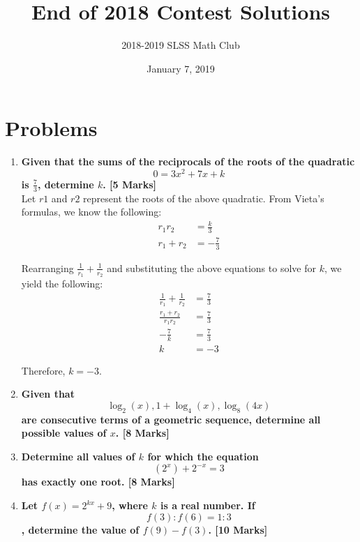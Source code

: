 \documentclass[12pt]{article}
\title{End of 2018 Contest Solutions\vspace{-3mm}}
\author{2018-2019 SLSS Math Club\vspace{-5mm}}
\date{January 7, 2019\vspace{-5mm}}
\begin{document}
\maketitle

\section*{Problems}

\begin{enumerate}
    \item \textbf{Given that the sums of the reciprocals of the roots of the quadratic $$ 0 = 3x^2 + 7x + k$$ is $\displaystyle{\frac{7}{3}}$, determine $k$. [5 Marks]} \\
    
    Let $r1$ and $r2$ represent the roots of the above quadratic.  From Vieta's formulas, we know the following:
    \begin{align*}
        r_1r_2 &= \frac{k}{3} \\
        r_1 + r_2 &= -\frac{7}{3}
    \end{align*}
    
    Rearranging $\frac{1}{r_1} + \frac{1}{r_2}$ and substituting the above equations to solve for $k$, we yield the following:
    \begin{align*}
        \frac{1}{r_1} + \frac{1}{r_2} &= \frac{7}{3} \\
        \frac{r_1 + r_2}{r_1r_2} &= \frac{7}{3} \\
        -\frac{7}{k} &= \frac{7}{3} \\
        k &= -3
    \end{align*}
    
    Therefore, $k = -3$.
    
    \item \textbf{Given that $$\log_2(x), 1 + \log_4(x), \log_8(4x)$$ are consecutive terms of a geometric sequence, determine all possible values of $x$. [8 Marks]} 
    
    \item \textbf{Determine all values of $k$ for which the equation $$(2^x) + 2^{-x} = 3$$ has exactly one root. [8 Marks]}
    
    \item \textbf{Let $f(x) = 2^{kx} + 9$, where $k$ is a real number. If $$f(3):f(6) = 1:3$$, determine the value of $f(9) - f(3)$. [10 Marks]}
\end{enumerate}
\end{document}

